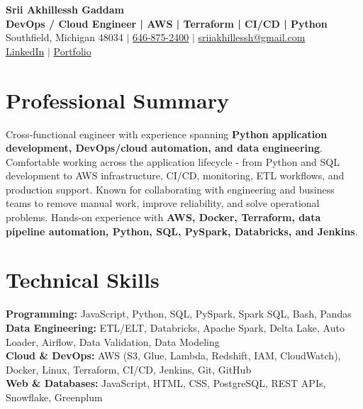 \documentclass[letterpaper,10pt]{article}
\begin{document}
\fontsize{9.35pt}{10.45pt}\selectfont

\begin{center}
    {\LARGE \textbf{Srii Akhillessh Gaddam}} \\[-1pt]
    \textbf{DevOps / Cloud Engineer | AWS | Terraform | CI/CD | Python} \\[2pt]
    Southfield, Michigan 48034 $|$
    \href{tel:6468752400}{646-875-2400} $|$
    \href{mailto:sriiakhillessh@gmail.com}{sriiakhillessh@gmail.com} \\[1pt]
    \href{https://www.linkedin.com/in/srii-akhiilessh-gaddam-b48668191/}{LinkedIn} $|$
    \href{https://sriiakhillesshg.github.io/portfolio/}{Portfolio}
\end{center}
\vspace{-8pt}

\section{Professional Summary}
\small{Cross-functional engineer with experience spanning \textbf{Python application development, DevOps/cloud automation, and data engineering}. Comfortable working across the application lifecycle - from Python and SQL development to AWS infrastructure, CI/CD, monitoring, ETL workflows, and production support. Known for collaborating with engineering and business teams to remove manual work, improve reliability, and solve operational problems. Hands-on experience with \textbf{AWS, Docker, Terraform, data pipeline automation, Python, SQL, PySpark, Databricks, and Jenkins}.}

\section{Technical Skills}
\small{
\textbf{Programming:} JavaScript, Python, SQL, PySpark, Spark SQL, Bash, Pandas \\
\textbf{Data Engineering:} ETL/ELT, Databricks, Apache Spark, Delta Lake, Auto Loader, Airflow, Data Validation, Data Modeling \\
\textbf{Cloud \& DevOps:} AWS (S3, Glue, Lambda, Redshift, IAM, CloudWatch), Docker, Linux, Terraform, CI/CD, Jenkins, Git, GitHub \\
\textbf{Web \& Databases:} JavaScript, HTML, CSS, PostgreSQL, REST APIs, Snowflake, Greenplum
}
\end{document}
